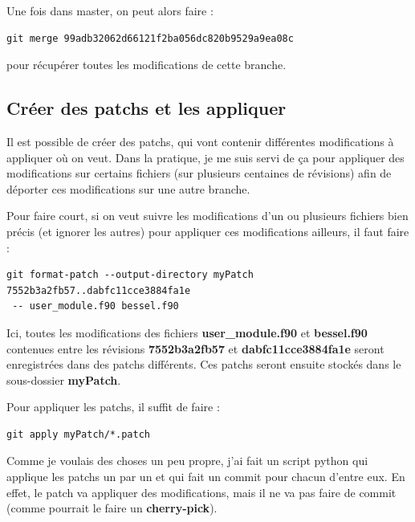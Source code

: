 \documentclass[a4paper,twoside]{article}
\begin{document}
Une fois dans master, on peut alors faire : 
\begin{verbatim}
git merge 99adb32062d66121f2ba056dc820b9529a9ea08c
\end{verbatim}
pour récupérer toutes les modifications de cette branche.

\subsection{Créer des patchs et les appliquer}
Il est possible de créer des patchs, qui vont contenir différentes modifications à appliquer où on veut. Dans la pratique, je me suis servi de ça pour appliquer des modifications sur certains fichiers (sur plusieurs centaines de révisions) afin de déporter ces modifications sur une autre branche. 

Pour faire court, si on veut suivre les modifications d'un ou plusieurs fichiers bien précis (et ignorer les autres) pour appliquer ces modifications ailleurs, il faut faire : 
\begin{verbatim}
git format-patch --output-directory myPatch 7552b3a2fb57..dabfc11cce3884fa1e
 -- user_module.f90 bessel.f90
\end{verbatim}

Ici, toutes les modifications des fichiers \textbf{user\_module.f90} et \textbf{bessel.f90} contenues entre les révisions \textbf{7552b3a2fb57} et \textbf{dabfc11cce3884fa1e} seront enregistrées dans des patchs différents. Ces patchs seront ensuite stockés dans le sous-dossier \textbf{myPatch}. 

\bigskip

Pour appliquer les patchs, il suffit de faire :
\begin{verbatim}
git apply myPatch/*.patch
\end{verbatim}

\begin{remarque}
Comme je voulais des choses un peu propre, j'ai fait un script python qui applique les patchs un par un et qui fait un commit pour chacun d'entre eux. En effet, le patch va appliquer des modifications, mais il ne va pas faire de commit (comme pourrait le faire un \textbf{cherry-pick}). 
\end{remarque}
\end{document}
